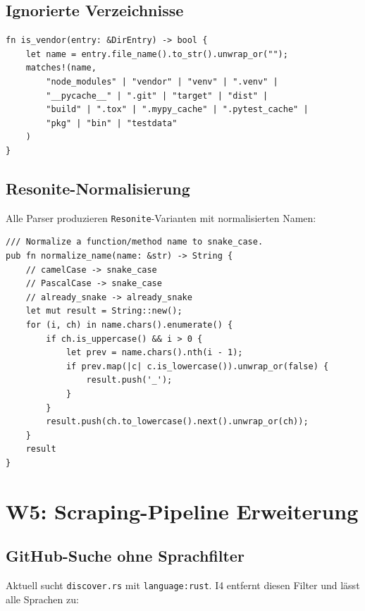 \documentclass[11pt,a4paper]{article}
\begin{document}
\subsection{Ignorierte Verzeichnisse}

\begin{lstlisting}[style=rust]
fn is_vendor(entry: &DirEntry) -> bool {
    let name = entry.file_name().to_str().unwrap_or("");
    matches!(name, 
        "node_modules" | "vendor" | "venv" | ".venv" |
        "__pycache__" | ".git" | "target" | "dist" |
        "build" | ".tox" | ".mypy_cache" | ".pytest_cache" |
        "pkg" | "bin" | "testdata"
    )
}
\end{lstlisting}

\subsection{Resonite-Normalisierung}

Alle Parser produzieren \texttt{Resonite}-Varianten mit 
normalisierten Namen:

\begin{lstlisting}[style=rust]
/// Normalize a function/method name to snake_case.
pub fn normalize_name(name: &str) -> String {
    // camelCase -> snake_case
    // PascalCase -> snake_case  
    // already_snake -> already_snake
    let mut result = String::new();
    for (i, ch) in name.chars().enumerate() {
        if ch.is_uppercase() && i > 0 {
            let prev = name.chars().nth(i - 1);
            if prev.map(|c| c.is_lowercase()).unwrap_or(false) {
                result.push('_');
            }
        }
        result.push(ch.to_lowercase().next().unwrap_or(ch));
    }
    result
}
\end{lstlisting}


\section{W5: Scraping-Pipeline Erweiterung}
\label{sec:scraping}

\subsection{GitHub-Suche ohne Sprachfilter}

Aktuell sucht \texttt{discover.rs} mit 
\texttt{language:rust}. I4 entfernt diesen Filter und 
l\"asst alle Sprachen zu:
\end{document}
